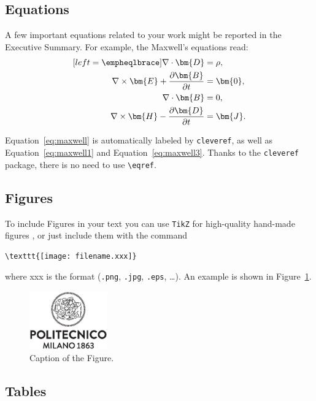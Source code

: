\documentclass[11pt,a4paper,twocolumn]{article}
\begin{document}
\subsection{Equations}
\label{sec_equations}
A few important equations related to your work might be reported in the Executive Summary. For example, the Maxwell's equations read:
\begin{subequations}
    \label{eq:maxwell}
    \begin{align}[left=\empheqlbrace]
    \nabla\cdot \bm{D} & = \rho, \label{eq:maxwell1} \\
    \nabla \times \bm{E} +  \frac{\partial \bm{B}}{\partial t} & = \bm{0}, \label{eq:maxwell2} \\
    \nabla\cdot \bm{B} & = 0, \label{eq:maxwell3} \\
    \nabla \times \bm{H} - \frac{\partial \bm{D}}{\partial t} &= \bm{J}. \label{eq:maxwell4}
    \end{align}
\end{subequations}

Equation~\eqref{eq:maxwell} is automatically labeled by \texttt{cleveref},
as well as Equation~\eqref{eq:maxwell1} and Equation~\eqref{eq:maxwell3}.
Thanks to the \verb|cleveref| package, there is no need to use \verb|\eqref|.

\subsection{Figures}
\label{sec:figures}
To include Figures in your text you can use \texttt{TikZ} for high-quality hand-made figures \cite{tikz},
or just include them with the command
\begin{verbatim}
\texttt{[image: filename.xxx]}
\end{verbatim}
where xxx is the format (\verb|.png|, \verb|.jpg|, \verb|.eps|, \dots).
An example is shown in Figure~\ref{fig:quadtree}.
\begin{figure}[H]
    \centering
    \includegraphics[width=0.3\textwidth]{logo_polimi_scritta.eps}
    \caption{Caption of the Figure.}
    \label{fig:quadtree}
\end{figure}

\subsection{Tables}
\label{subsec:tables}
\end{document}
